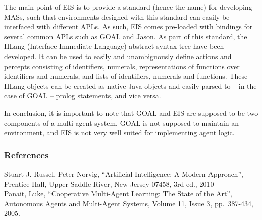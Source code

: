 The main point of EIS is to provide a standard (hence the name) for
developing MASs, such that environments designed with this standard
can easily be interfaced with different APLs. As such, EIS comes pre-loaded
with bindings for several common APLs such as GOAL and Jason. As part
of this standard, the IILang (Interface Immediate Language) abstract
syntax tree have been developed. It can be used to easily and unambiguously
define actions and percepts consisting of identifiers, numerals, representations
of functions over identifiers and numerals, and lists of identifiers,
numerals and functions. These IILang objects can be created as native
Java objects and easily parsed to -- in the case of GOAL -- prolog
statements, and vice versa.

In conclusion, it is important to note that GOAL and EIS are supposed
to be two components of a multi-agent system. GOAL is not supposed
to maintain an environment, and EIS is not very well suited for implementing
agent logic.


\subsubsection*{References}

Stuart J. Russel, Peter Norvig, ``Artificial Intelligence: A Modern
Approach'', Prentice Hall, Upper Saddle River, New Jersey 07458,
3rd ed., 2010\\


Panait, Luke, ``Cooperative Multi-Agent Learning: The State of the
Art'', Autonomous Agents and Multi-Agent Systems, Volume 11, Issue
3, pp.\ 387-434, 2005.
